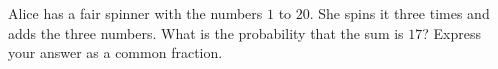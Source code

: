 Alice has a fair spinner with the numbers $1$ to $20$. She spins it three times and adds the three numbers. What is the probability that the sum is $17$? Express your answer as a common fraction.
